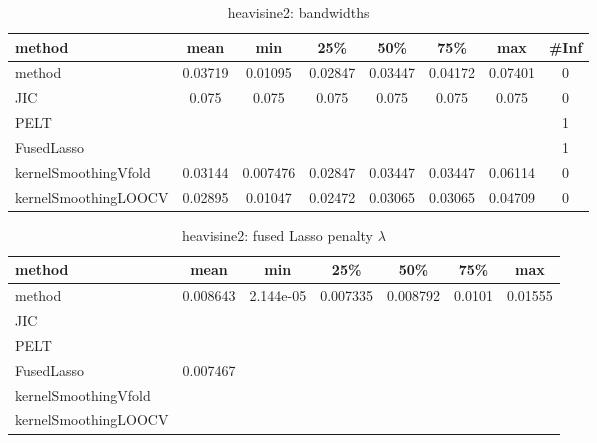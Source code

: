 \begin{table}[ht]
\centering
\begin{tabular}{l|c|ccccc|c}
  \hline
method & mean & min & 25\% & 50\% & 75\% & max & \#Inf \\ 
  \hline
method & 0.03719 & 0.01095 & 0.02847 & 0.03447 & 0.04172 & 0.07401 &   0 \\ 
  JIC & 0.075 & 0.075 & 0.075 & 0.075 & 0.075 & 0.075 &   0 \\ 
  PELT &  &  &  &  &  &  &   1 \\ 
  FusedLasso &  &  &  &  &  &  &   1 \\ 
  kernelSmoothingVfold & 0.03144 & 0.007476 & 0.02847 & 0.03447 & 0.03447 & 0.06114 &   0 \\ 
  kernelSmoothingLOOCV & 0.02895 & 0.01047 & 0.02472 & 0.03065 & 0.03065 & 0.04709 &   0 \\ 
   \hline
\end{tabular}
\caption{heavisine2: bandwidths} 
\label{tab:heavisine2Bandwidths}
\end{table}
\begin{table}[ht]
\centering
\begin{tabular}{l|c|ccccc}
  \hline
method & mean & min & 25\% & 50\% & 75\% & max \\ 
  \hline
method & 0.008643 & 2.144e-05 & 0.007335 & 0.008792 & 0.0101 & 0.01555 \\ 
  JIC &  &  &  &  &  &  \\ 
  PELT &  &  &  &  &  &  \\ 
  FusedLasso & 0.007467 &  &  &  &  &  \\ 
  kernelSmoothingVfold &  &  &  &  &  &  \\ 
  kernelSmoothingLOOCV &  &  &  &  &  &  \\ 
   \hline
\end{tabular}
\caption{heavisine2: fused Lasso penalty $\lambda$} 
\label{tab:heavisine2Lambdas}
\end{table}
